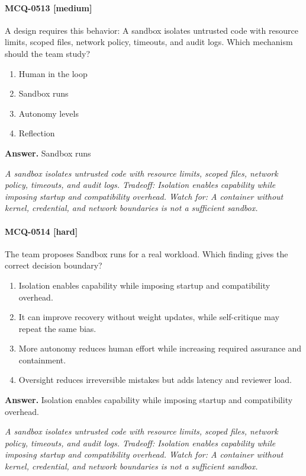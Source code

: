 \paragraph{MCQ-0513 [medium]} A design requires this behavior: A sandbox isolates untrusted code with resource limits, scoped files, network policy, timeouts, and audit logs. Which mechanism should the team study?
\begin{enumerate}[label=\Alph*.]
\item Human in the loop
\item Sandbox runs
\item Autonomy levels
\item Reflection
\end{enumerate}
\noindent\textbf{Answer.} Sandbox runs
\par\textit{A sandbox isolates untrusted code with resource limits, scoped files, network policy, timeouts, and audit logs. Tradeoff: Isolation enables capability while imposing startup and compatibility overhead. Watch for: A container without kernel, credential, and network boundaries is not a sufficient sandbox.}
\paragraph{MCQ-0514 [hard]} The team proposes Sandbox runs for a real workload. Which finding gives the correct decision boundary?
\begin{enumerate}[label=\Alph*.]
\item Isolation enables capability while imposing startup and compatibility overhead.
\item It can improve recovery without weight updates, while self-critique may repeat the same bias.
\item More autonomy reduces human effort while increasing required assurance and containment.
\item Oversight reduces irreversible mistakes but adds latency and reviewer load.
\end{enumerate}
\noindent\textbf{Answer.} Isolation enables capability while imposing startup and compatibility overhead.
\par\textit{A sandbox isolates untrusted code with resource limits, scoped files, network policy, timeouts, and audit logs. Tradeoff: Isolation enables capability while imposing startup and compatibility overhead. Watch for: A container without kernel, credential, and network boundaries is not a sufficient sandbox.}
